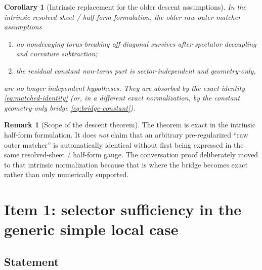 \documentclass[11pt]{article}
\numberwithin{equation}{section}
\newtheorem{corollary}[theorem]{Corollary}
\theoremstyle{definition}
\newtheorem{remark}[theorem]{Remark}
\begin{document}
\begin{corollary}[Intrinsic replacement for the older descent assumptions]
\label{cor:intrinsic-H1H2}
In the intrinsic resolved-sheet / half-form formulation, the older raw outer-matcher assumptions
\begin{enumerate}
  \item no nondecaying torus-breaking off-diagonal survives after spectator decoupling and curvature subtraction;
  \item the residual constant non-torus part is sector-independent and geometry-only,
\end{enumerate}
are no longer independent hypotheses. They are absorbed by the exact identity \eqref{eq:matched-identity} (or, in a different exact normalization, by the constant geometry-only bridge \eqref{eq:bridge-constant}).
\end{corollary}

\begin{remark}[Scope of the descent theorem]
\label{rem:scope-descent}
The theorem is exact in the intrinsic half-form formulation. It does \emph{not} claim that an arbitrary pre-regularized ``raw outer matcher'' is automatically identical without first being expressed in the same resolved-sheet / half-form gauge. The conversation proof deliberately moved to that intrinsic normalization because that is where the bridge becomes exact rather than only numerically supported.
\end{remark}

\section{Item 1: selector sufficiency in the generic simple local case}
\label{sec:selector-sufficiency}

\subsection{Statement}
\end{document}
